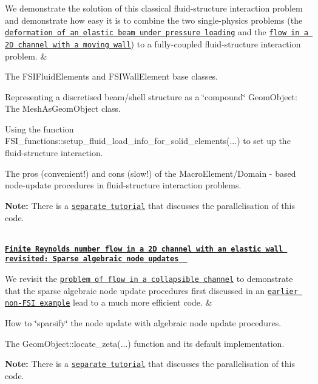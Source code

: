 \begin{longtabu}
We demonstrate the solution of this classical fluid-\/structure interaction problem and demonstrate how easy it is to combine the two single-\/physics problems (the \href{../../beam/tensioned_string/html/index.html}{\tt deformation of an elastic beam under pressure loading} and the \href{../../navier_stokes/collapsible_channel/html/index.html}{\tt flow in a 2D channel with a moving wall}) to a fully-\/coupled fluid-\/structure interaction problem.  &
\begin{DoxyItemize}
\item The {\ttfamily F\+S\+I\+Fluid\+Elements} and {\ttfamily F\+S\+I\+Wall\+Element} base classes.
\item Representing a discretised beam/shell structure as a \char`\"{}compound\char`\"{} {\ttfamily Geom\+Object\+:} The {\ttfamily Mesh\+As\+Geom\+Object} class.
\item Using the function {\ttfamily F\+S\+I\+\_\+functions\+::setup\+\_\+fluid\+\_\+load\+\_\+info\+\_\+for\+\_\+solid\+\_\+elements}(...) to set up the fluid-\/structure interaction.
\item The pros (convenient!) and cons (slow!) of the {\ttfamily Macro\+Element/\+Domain} -\/ based node-\/update procedures in fluid-\/structure interaction problems.
\end{DoxyItemize}
\begin{DoxyItemize}
\item {\bfseries Note\+:} There is a \href{../../mpi/fsi_channel_with_leaflet/html/index.html}{\tt separate tutorial} that discusses the parallelisation of this code. 
\end{DoxyItemize}

\\
\href{../../interaction/fsi_collapsible_channel_algebraic/html/index.html}{\tt {\bfseries Finite Reynolds number flow in a 2D channel with an elastic wall revisited\+: Sparse algebraic node updates } }

We revisit the \href{../../interaction/fsi_collapsible_channel/html/index.html}{\tt problem of flow in a collapsible channel} to demonstrate that the sparse algebraic node update procedures first discussed in an \href{../../navier_stokes/algebraic_collapsible_channel/html/index.html}{\tt earlier non-\/\+F\+SI example} lead to a much more efficient code.  &
\begin{DoxyItemize}
\item How to \char`\"{}sparsify\char`\"{} the node update with algebraic node update procedures.
\item The {\ttfamily Geom\+Object\+::locate\+\_\+zeta}(...) function and its default implementation.
\end{DoxyItemize}
\begin{DoxyItemize}
\item {\bfseries Note\+:} There is a \href{../../mpi/fsi_channel_with_leaflet/html/index.html}{\tt separate tutorial} that discusses the parallelisation of this code. 
\end{DoxyItemize}


\end{longtabu}
